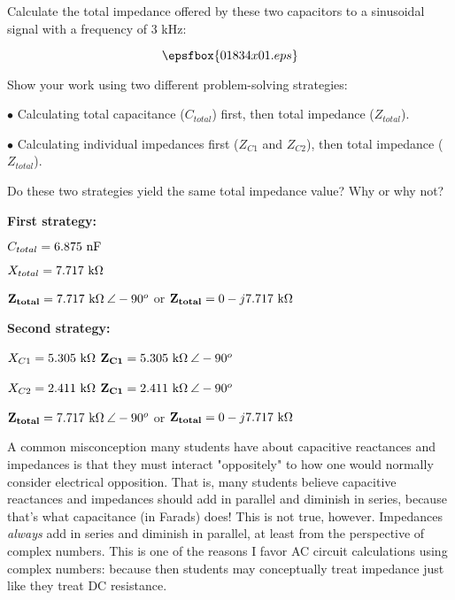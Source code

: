 

Calculate the total impedance offered by these two capacitors to a sinusoidal signal with a frequency of 3 kHz:

$$\epsfbox{01834x01.eps}$$

Show your work using two different problem-solving strategies:

\medskip
\item{$\bullet$} Calculating total capacitance ($C_{total}$) first, then total impedance ($Z_{total}$).
\item{$\bullet$} Calculating individual impedances first ($Z_{C1}$ and $Z_{C2}$), then total impedance ($Z_{total}$).
\medskip

Do these two strategies yield the same total impedance value?  Why or why not?







\noindent
{\bf First strategy:}

$C_{total} = 6.875 \hbox{ nF}$

$X_{total} = 7.717 \hbox{ k}\Omega$

${\bf Z_{total}} = 7.717 \hbox{ k}\Omega \> \angle -90^o$ or ${\bf Z_{total}} = 0 - j7.717 \hbox{ k}\Omega$

\vskip 10pt

\goodbreak

\noindent
{\bf Second strategy:}

$X_{C1} = 5.305 \hbox{ k}\Omega$ \hskip 10pt ${\bf Z_{C1}} = 5.305 \hbox{ k}\Omega \> \angle -90^o$

$X_{C2} = 2.411 \hbox{ k}\Omega$ \hskip 10pt ${\bf Z_{C1}} = 2.411 \hbox{ k}\Omega \> \angle -90^o$

${\bf Z_{total}} = 7.717 \hbox{ k}\Omega \> \angle -90^o$ or ${\bf Z_{total}} = 0 - j7.717 \hbox{ k}\Omega$







A common misconception many students have about capacitive reactances and impedances is that they must interact "oppositely" to how one would normally consider electrical opposition.  That is, many students believe capacitive reactances and impedances should add in parallel and diminish in series, because that's what capacitance (in Farads) does!  This is not true, however.  Impedances {\it always} add in series and diminish in parallel, at least from the perspective of complex numbers.  This is one of the reasons I favor AC circuit calculations using complex numbers: because then students may conceptually treat impedance just like they treat DC resistance.

